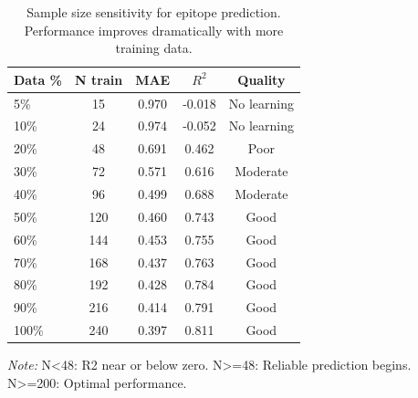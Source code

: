 \begin{table}[htbp]
\centering
\caption{Sample size sensitivity for epitope prediction. Performance improves dramatically with more training data.}
\label{tab:sensitivity}
\begin{tabular}{lcccc}
\toprule
Data \% & N train & MAE & $R^2$ & Quality \\
\midrule
5\% & 15 & 0.970 & -0.018 & No learning \\
10\% & 24 & 0.974 & -0.052 & No learning \\
20\% & 48 & 0.691 & 0.462 & Poor \\
30\% & 72 & 0.571 & 0.616 & Moderate \\
40\% & 96 & 0.499 & 0.688 & Moderate \\
50\% & 120 & 0.460 & 0.743 & Good \\
60\% & 144 & 0.453 & 0.755 & Good \\
70\% & 168 & 0.437 & 0.763 & Good \\
80\% & 192 & 0.428 & 0.784 & Good \\
90\% & 216 & 0.414 & 0.791 & Good \\
100\% & 240 & 0.397 & 0.811 & Good \\
\bottomrule
\end{tabular}
\footnotesize {\textit{Note:} N<48: R2 near or below zero. N>=48: Reliable prediction begins. N>=200: Optimal performance.}
\end{table}
